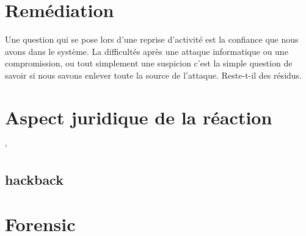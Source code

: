 \section{Remédiation}




Une question qui se pose lors d’une reprise d’activité est la confiance que nous avons dans le système. La difficultés après une attaque informatique ou une compromission, ou tout simplement une suspicion c’est la simple question de savoir si nous savons enlever toute la source de l’attaque. Reste-t-il des résidus.

\section{Aspect juridique de la réaction}
`
\subsection{hackback}

\section{Forensic}
